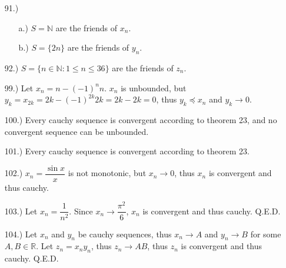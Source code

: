 \documentclass[12pt]{article}
\begin{document}
\begin{itemize}


    \item [91.)] \begin{itemize}
        \item [a.)] $S=\mathbb{N}$ are the friends of $x_n$.

    \item [b.)] $S=\{2n\}$ are the friends of $y_n$.
    \end{itemize}

    \item [92.)] $S=\{n\in\mathbb{N}:1\leq n\leq36\}$ are the friends of $z_n$.






    \item [99.)] Let $x_n=n-(-1)^nn$. $x_n$ is unbounded, but $y_k=x_{2k}=2k-(-1)^{2k}2k=2k-2k=0$, thus $y_k\preceq x_n$ and $y_k\to0$.

    \item [100.)] Every cauchy sequence is convergent according to theorem 23, and no convergent sequence can be unbounded.

    \item [101.)] Every cauchy sequence is convergent according to theorem 23.

    \item [102.)] $x_n=\dfrac{\sin x}{x}$ is not monotonic, but $x_n\to0$, thus $x_n$ is convergent and thus cauchy.

    \item [103.)] Let $x_n=\dfrac{1}{n^2}$. Since $x_n\to\dfrac{\pi^2}{6}$, $x_n$ is convergent and thus cauchy. Q.E.D.

    \item [104.)] Let $x_n$ and $y_n$ be cauchy sequences, thus $x_n\to A$ and $y_n\to B$ for some $A,B\in\mathbb{R}$. Let $z_n=x_ny_n$, thus $z_n\to AB$, thus $z_n$ is convergent and thus cauchy. Q.E.D.


\end{itemize}
\end{document}
